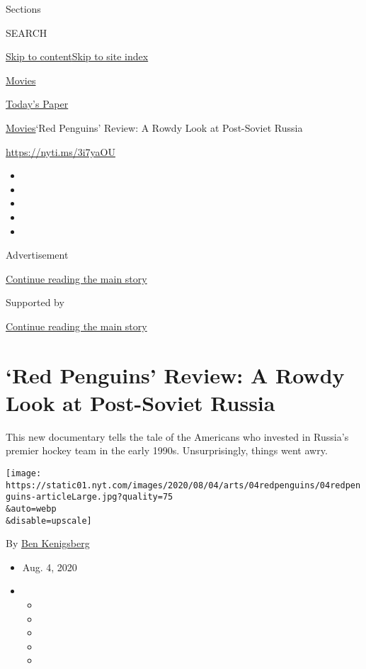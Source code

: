 Sections

SEARCH

\protect\hyperlink{site-content}{Skip to
content}\protect\hyperlink{site-index}{Skip to site index}

\href{https://www.nytimes.com/section/movies}{Movies}

\href{https://myaccount.nytimes.com/auth/login?response_type=cookie\&client_id=vi}{}

\href{https://www.nytimes.com/section/todayspaper}{Today's Paper}

\href{/section/movies}{Movies}\textbar{}`Red Penguins' Review: A Rowdy
Look at Post-Soviet Russia

\url{https://nyti.ms/3i7yaOU}

\begin{itemize}
\item
\item
\item
\item
\item
\end{itemize}

Advertisement

\protect\hyperlink{after-top}{Continue reading the main story}

Supported by

\protect\hyperlink{after-sponsor}{Continue reading the main story}

\hypertarget{red-penguins-review-a-rowdy-look-at-post-soviet-russia}{%
\section{`Red Penguins' Review: A Rowdy Look at Post-Soviet
Russia}\label{red-penguins-review-a-rowdy-look-at-post-soviet-russia}}

This new documentary tells the tale of the Americans who invested in
Russia's premier hockey team in the early 1990s. Unsurprisingly, things
went awry.

\texttt{[image: https://static01.nyt.com/images/2020/08/04/arts/04redpenguins/04redpenguins-articleLarge.jpg?quality=75\\\&auto=webp\\\&disable=upscale]}

By \href{https://www.nytimes.com/by/ben-kenigsberg}{Ben Kenigsberg}

\begin{itemize}
\item
  Aug. 4, 2020
\item
  \begin{itemize}
  \item
  \item
  \item
  \item
  \item
  \end{itemize}
\end{itemize}

